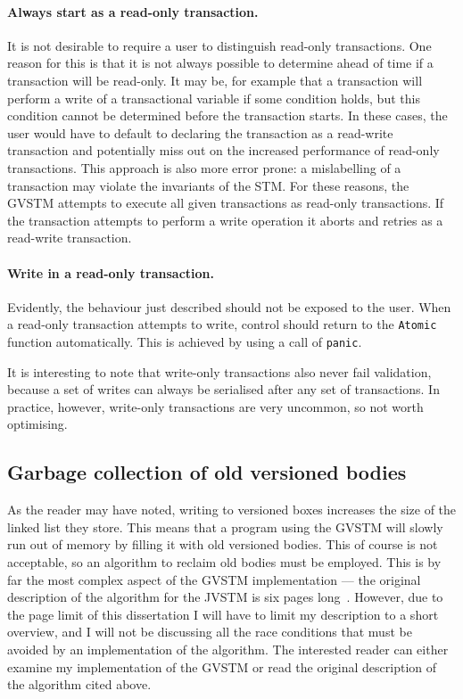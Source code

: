 \documentclass[12pt,a4paper,oneside,openright]{report}
\newcommand{\goFunc}[1]{\texttt{#1}}
\begin{document}
\paragraph{Always start as a read-only transaction.} It is not
desirable to require a user to distinguish read-only transactions. One
reason for this is that it is not always possible to determine ahead
of time if a transaction will be read-only. It may be, for example
that a transaction will perform a write of a transactional variable if
some condition holds, but this condition cannot be determined before
the transaction starts. In these cases, the user would have to default
to declaring the transaction as a read-write transaction and
potentially miss out on the increased performance of read-only
transactions. This approach is also more error prone: a mislabelling
of a transaction may violate the invariants of the STM. For these
reasons, the GVSTM attempts to execute all given transactions as
read-only transactions. If the transaction attempts to perform a write
operation it aborts and retries as a read-write transaction.

\paragraph{Write in a read-only transaction.} Evidently, the behaviour
just described should not be exposed to the user. When a read-only
transaction attempts to write, control should return to the
\goFunc{Atomic} function automatically. This is achieved by using a
call of \goFunc{panic}.

It is interesting to note that write-only transactions also never fail
validation, because a set of writes can always be serialised after any
set of transactions. In practice, however, write-only transactions are
very uncommon, so not worth optimising.

\subsection{Garbage collection of old versioned bodies}
\label{sec:impl:garbage-collection}

As the reader may have noted, writing to versioned boxes increases the
size of the linked list they store. This means that a program using
the GVSTM will slowly run out of memory by filling it with old
versioned bodies. This of course is not acceptable, so an algorithm to
reclaim old bodies must be employed. This is by far the most complex
aspect of the GVSTM implementation --- the original description of the
algorithm for the JVSTM is six pages
long~\cite[Section~4.4.7]{cachopo2007phd}.  However, due to the page
limit of this dissertation I will have to limit my description to a
short overview, and I will not be discussing all the race conditions
that must be avoided by an implementation of the algorithm. The
interested reader can either examine my implementation of the GVSTM or
read the original description of the algorithm cited above.
\end{document}
